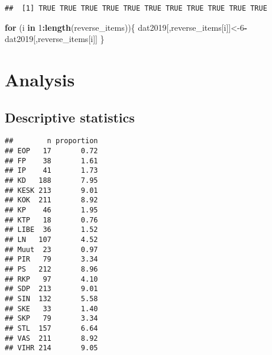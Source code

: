 \documentclass[
]{article}
\newenvironment{Shaded}{\begin{snugshade}}{\end{snugshade}}
\newcommand{\CommentTok}[1]{\textcolor[rgb]{0.56,0.35,0.01}{\textit{#1}}}
\newcommand{\ControlFlowTok}[1]{\textcolor[rgb]{0.13,0.29,0.53}{\textbf{#1}}}
\newcommand{\DataTypeTok}[1]{\textcolor[rgb]{0.13,0.29,0.53}{#1}}
\newcommand{\DecValTok}[1]{\textcolor[rgb]{0.00,0.00,0.81}{#1}}
\newcommand{\KeywordTok}[1]{\textcolor[rgb]{0.13,0.29,0.53}{\textbf{#1}}}
\newcommand{\NormalTok}[1]{#1}
\newcommand{\OperatorTok}[1]{\textcolor[rgb]{0.81,0.36,0.00}{\textbf{#1}}}
\begin{document}
\begin{verbatim}
##  [1] TRUE TRUE TRUE TRUE TRUE TRUE TRUE TRUE TRUE TRUE TRUE
\end{verbatim}

\begin{Shaded}
\begin{Highlighting}[]
\ControlFlowTok{for}\NormalTok{ (i }\ControlFlowTok{in} \DecValTok{1}\OperatorTok{:}\KeywordTok{length}\NormalTok{(reverse_items))\{}
\NormalTok{  dat2019[,reverse_items[i]]<-}\DecValTok{6}\OperatorTok{-}\NormalTok{dat2019[,reverse_items[i]]}
\NormalTok{\}}
\end{Highlighting}
\end{Shaded}

\newpage

\hypertarget{analysis}{%
\section{Analysis}\label{analysis}}

\hypertarget{descriptive-statistics}{%
\subsection{Descriptive statistics}\label{descriptive-statistics}}

\begin{Shaded}
\end{Shaded}

\begin{verbatim}
##        n proportion
## EOP   17       0.72
## FP    38       1.61
## IP    41       1.73
## KD   188       7.95
## KESK 213       9.01
## KOK  211       8.92
## KP    46       1.95
## KTP   18       0.76
## LIBE  36       1.52
## LN   107       4.52
## Muut  23       0.97
## PIR   79       3.34
## PS   212       8.96
## RKP   97       4.10
## SDP  213       9.01
## SIN  132       5.58
## SKE   33       1.40
## SKP   79       3.34
## STL  157       6.64
## VAS  211       8.92
## VIHR 214       9.05
\end{verbatim}
\end{document}
